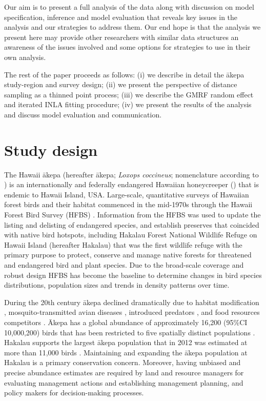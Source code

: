 \documentclass[preprint,12pt]{elsarticle}
\newcommand{\akepa}{\textquotesingle\={a}kepa}  %
\newcommand{\Akepa}{\textquotesingle\={A}kepa}  %
\newcommand{\hawaii}{Hawai\textquotesingle i}   %
\begin{document}
Our aim is to present a full analysis of the data along with discussion on model specification, inference and model evaluation that reveals key issues in the analysis and our strategies to address them.  Our end hope is that the analysis we present here may provide other researchers with similar data structures an awareness of the issues involved and some options for strategies to use in their own analysis.

The rest of the paper proceeds as follows:  (i) we describe in detail the \akepa{} study-region and survey design; (ii) we present the perspective of distance sampling as a thinned point process; (iii) we describe the GMRF random effect and iterated INLA fitting procedure; (iv) we present the results of the analysis and discuss model evaluation and communication.

\section{Study design}

The \hawaii{} \akepa{} (hereafter \akepa{}; \textit{Loxops coccineus}; nomenclature according to \citealp{usfws_akepa_1970}) is an internationally and federally endangered Hawaiian honeycreeper (\citealp{usfws_akepa_1970, birdlife_akepa_2016}) that is endemic to \hawaii{} Island, USA.  Large-scale, quantitative surveys of Hawaiian forest birds and their habitat commenced in the mid-1970s through the Hawaii Forest Bird Survey (HFBS) \citep{scott_HFBS_1986}. Information from the HFBS was used to update the listing and delisting of endangered species, and establish preserves that coincided with native bird hotspots, including Hakalau Forest National Wildlife Refuge on \hawaii{} Island (hereafter Hakalau) that was the first wildlife refuge with the primary purpose to protect, conserve and manage native forests for threatened and endangered bird and plant species. Due to the broad-scale coverage and robust design HFBS has become the baseline to determine changes in bird species distributions, population sizes and trends in density patterns over time.

During the 20th century \akepa{} declined dramatically due to habitat modification \citep{scott_HFBS_1986, pratt_avifaunal_1994},  mosquito-transmitted avian diseases \citep{pratt_avifaunal_1994, atkinson_wildlife_1995}, introduced predators \citep{lepson_akepa_1997}, and food resources competitors \citep{lepson_akepa_1997}. \Akepa{} has a global abundance of approximately 16,200 (95\%CI 10,000,200) birds that has been restricted to five spatially distinct populations \citep{judge_akepa_2018}. Hakalau supports the largest \akepa{} population that in 2012 was estimated at more than 11,000 birds \citep{camp_statespace_2016}. Maintaining and expanding the \akepa{} population at Hakalau is a primary conservation concern. Moreover, having unbiased and precise abundance estimates are required by land and resource managers for evaluating management actions and establishing management planning, and policy makers for decision-making processes.
\end{document}
